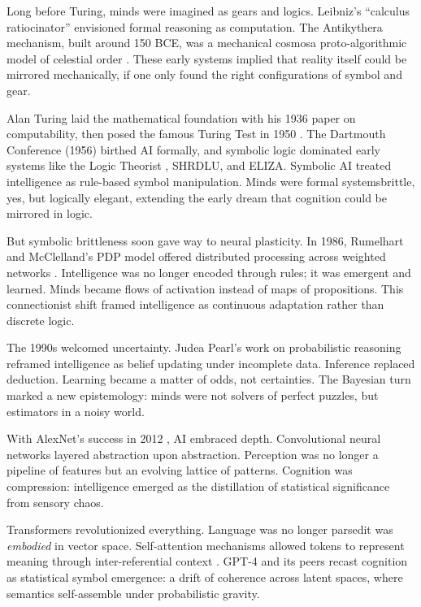 \documentclass[12pt]{article}
\begin{document}
Long before Turing, minds were imagined as gears and logics. Leibniz's ``calculus ratiocinator'' envisioned formal reasoning as computation. The Antikythera mechanism, built around 150 BCE, was a mechanical cosmos\textemdash a proto-algorithmic model of celestial order \parencite{freeth2006nature}. These early systems implied that reality itself could be mirrored mechanically, if one only found the right configurations of symbol and gear.

Alan Turing laid the mathematical foundation with his 1936 paper on computability, then posed the famous Turing Test in 1950 \parencite{turing1950computing}. The Dartmouth Conference (1956) birthed AI formally, and symbolic logic dominated early systems like the Logic Theorist \parencite{newell1956logic}, SHRDLU, and ELIZA. Symbolic AI treated intelligence as rule-based symbol manipulation. Minds were formal systems\textemdash brittle, yes, but logically elegant, extending the early dream that cognition could be mirrored in logic.

But symbolic brittleness soon gave way to neural plasticity. In 1986, Rumelhart and McClelland's PDP model offered distributed processing across weighted networks \parencite{rumelhart1986parallel}. Intelligence was no longer encoded through rules; it was emergent and learned. Minds became flows of activation instead of maps of propositions. This connectionist shift framed intelligence as continuous adaptation rather than discrete logic.

The 1990s welcomed uncertainty. Judea Pearl's work on probabilistic reasoning \parencite{pearl1988probabilistic} reframed intelligence as belief updating under incomplete data. Inference replaced deduction. Learning became a matter of odds, not certainties. The Bayesian turn marked a new epistemology: minds were not solvers of perfect puzzles, but estimators in a noisy world.

With AlexNet's success in 2012 \parencite{krizhevsky2012imagenet}, AI embraced depth. Convolutional neural networks layered abstraction upon abstraction. Perception was no longer a pipeline of features but an evolving lattice of patterns. Cognition was compression: intelligence emerged as the distillation of statistical significance from sensory chaos.

Transformers revolutionized everything. Language was no longer parsed\textemdash it was \textit{embodied} in vector space. Self-attention mechanisms allowed tokens to represent meaning through inter-referential context \parencite{vaswani2017attention}. GPT-4 and its peers recast cognition as statistical symbol emergence: a drift of coherence across latent spaces, where semantics self-assemble under probabilistic gravity.
\end{document}
